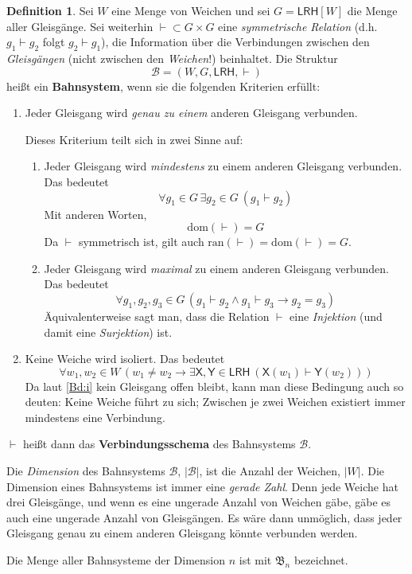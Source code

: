 \documentclass{article}
\theoremstyle{definition}
\newtheorem{defi}{Definition}
\newcommand{\connec}{\vdash}
\newcommand{\lrh}{\mathsf{LRH}}
\begin{document}
    \begin{defi}
	Sei $W$ eine Menge von Weichen und sei $G=\lrh[W]$ die Menge aller Gleisgänge. Sei weiterhin ${\connec}\subset G\times G$ eine \textit{symmetrische Relation} (d.h.\ $g_1\connec g_2$ folgt $g_2\connec g_1$), die Information über die Verbindungen zwischen den \textit{Gleisgängen} (nicht zwischen den \textit{Weichen}!) beinhaltet. Die Struktur
	\[ \mathcal{B}=(W,G,\lrh,\connec) \]
	heißt ein \textbf{Bahnsystem}, wenn sie die folgenden Kriterien erfüllt:
	\begin{enumerate}[label=\roman*., ref=(\roman*)]
	    \item Jeder Gleisgang wird \textit{genau zu einem} anderen Gleisgang verbunden.
		\label{Bd:i}

		Dieses Kriterium teilt sich in zwei Sinne auf:
		\begin{enumerate}[label*=\arabic*.]
		    \item Jeder Gleisgang wird \textit{mindestens} zu einem anderen Gleisgang verbunden. Das bedeutet
			\[ \forall g_1\in G\,\exists g_2\in G\ (g_1\connec g_2) \]
			Mit anderen Worten,
			\[ \mathrm{dom}(\connec) = G \]
			Da $\connec$ symmetrisch ist, gilt auch $\mathrm{ran}(\connec)=\mathrm{dom}(\connec)=G$.
		    \item Jeder Gleisgang wird \textit{maximal} zu einem anderen Gleisgang verbunden. Das bedeutet
			\[ \forall g_1,g_2,g_3\in G\,(g_1\connec g_2\land g_1\connec g_3 \to g_2=g_3) \]
			Äquivalenterweise sagt man, dass die Relation $\connec$ eine \textit{Injektion} (und damit eine \textit{Surjektion}) ist.
		\end{enumerate}

	    \item Keine Weiche wird isoliert. Das bedeutet
		\[ \forall w_1,w_2\in W\,(w_1\neq w_2 \to \exists\mathsf{X},\mathsf{Y}\in\lrh\ (\mathsf{X}(w_1)\connec\mathsf{Y}(w_2))) \]
		Da laut \ref{Bd:i} kein Gleisgang offen bleibt, kann man diese Bedingung auch so deuten: Keine Weiche führt zu sich; Zwischen je zwei Weichen existiert immer mindestens eine Verbindung.
	\end{enumerate}
	$\connec$ heißt dann das \textbf{Verbindungsschema} des Bahnsystems $\mathcal{B}$.

	Die \textit{Dimension} des Bahnsystems $\mathcal{B}$, $|\mathcal{B}|$, ist die Anzahl der Weichen, $|W|$. Die Dimension eines Bahnsystems ist immer eine \textit{gerade Zahl}. Denn jede Weiche hat drei Gleisgänge, und wenn es eine ungerade Anzahl von Weichen gäbe, gäbe es auch eine ungerade Anzahl von Gleisgängen. Es wäre dann unmöglich, dass jeder Gleisgang genau zu einem anderen Gleisgang könnte verbunden werden.

	Die Menge aller Bahnsysteme der Dimension $n$ ist mit $\mathfrak{B}_n$ bezeichnet.
    \end{defi}
\end{document}

